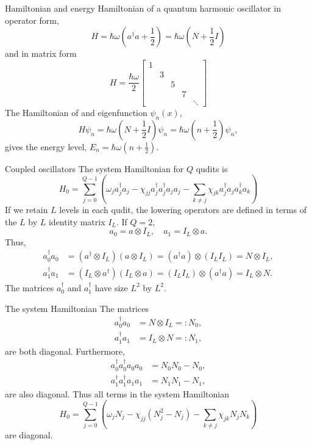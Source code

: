 \documentclass{beamer}
\begin{document}
\begin{frame}{Hamiltonian and energy}
  Hamiltonian of a quantum harmonic oscillator in operator form,
  \[
  H = \hbar\omega\left( a^\dag a + \frac{1}{2} \right) = \hbar\omega\left( N + \frac{1}{2} I \right)
  \]
  and in matrix form
  \[
H = \frac{\hbar\omega}{2}
\begin{bmatrix}
   1 &    &  &  & \\
      & 3 &     &  & \\
      &   &  5 &    & \\
      &   &     & 7 & \\
      &   &     &  & \ddots
\end{bmatrix}
\]
The Hamiltonian of and eigenfunction $\psi_n(x)$,
\[
H \psi_n = \hbar\omega\left( N + \frac{1}{2} I \right) \psi_n = \hbar\omega\left( n + \frac{1}{2} \right) \psi_n,
\]
gives the energy level, $E_n = \hbar\omega\left( n + \frac{1}{2} \right)$.
\end{frame}

\begin{frame}{Coupled oscillators}
  The system Hamiltonian for $Q$ qudits is
  \[
  H_0 = \sum_{j=0}^{Q-1} \left( \omega_j a^\dag_j a_j - \chi_{jj} a^\dag_ja^\dag_j a_j a_j -
  \sum_{k\ne j} \chi_{jk}  a^\dag_j  a_j  a^\dag_k  a_k \right)
  \]
  If we retain $L$ levels in each qudit, the lowering operators are defined in terms of the $L$ by
  $L$ identity matrix $I_L$. If $Q=2$,
  \[
  a_0 = a \otimes I_L, \quad  a_1 = I_L \otimes a.
  \]
  Thus,
  \begin{align*}
  a^\dag_0 a_0 &= (a^\dag \otimes I_L) (a \otimes I_L) = (a^\dag a)\otimes (I_L I_L) = N\otimes I_L,\\
  a^\dag_1 a_1 &= (I_L \otimes a^\dag ) (I_L \otimes a ) = (I_L I_L)  \otimes (a^\dag a) = I_L
  \otimes N.
  \end{align*}
  The matrices $a^\dag_0$ and $a^\dag_1$ have size $L^2$ by $L^2$.
\end{frame}

\begin{frame}{The system Hamiltonian}
  The matrices
  \begin{align*}
  a^\dag_0 a_0 & = N\otimes I_L =: N_0,\\
  a^\dag_1 a_1 & = I_L \otimes N =: N_1,
  \end{align*}
  are both diagonal. Furthermore,
  \begin{align*}
  a^\dag_0 a^\dag_0 a_0 a_0 &= N_0 N_0 - N_0,\\
  a^\dag_1 a^\dag_1 a_1 a_1 &= N_1 N_1 - N_1,
  \end{align*}
  are also diagonal. Thus all terms in the system Hamiltonian
  \[
  H_0 = \sum_{j=0}^{Q-1} \left( \omega_j N_j - \chi_{jj} (N_j^2 - N_j) -
  \sum_{k\ne j} \chi_{jk}  N_j  N_k \right)
  \]
  are diagonal.
  
\end{frame}
\end{document}
